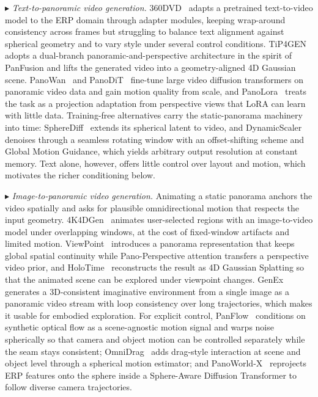 $\blacktriangleright$ \textit{Text-to-panoramic video generation.} 360DVD~\cite{wang2024360dvd} adapts a pretrained text-to-video model to the ERP domain through adapter modules, keeping wrap-around consistency across frames but struggling to balance text alignment against spherical geometry and to vary style under several control conditions.
TiP4GEN~\cite{xing2025tip4gen} adopts a dual-branch panoramic-and-perspective architecture in the spirit of PanFusion and lifts the generated video into a geometry-aligned 4D Gaussian scene.
PanoWan~\cite{xia2025panowan} and PanoDiT~\cite{zhang2025panodit} fine-tune large video diffusion transformers on panoramic video data and gain motion quality from scale, and PanoLora~\cite{dong2025panolora} treats the task as a projection adaptation from perspective views that LoRA can learn with little data.
Training-free alternatives carry the static-panorama machinery into time: SphereDiff~\cite{park2025spherediff} extends its spherical latent to video, and DynamicScaler~\cite{liu2025dynamicscaler} denoises through a seamless rotating window with an offset-shifting scheme and Global Motion Guidance, which yields arbitrary output resolution at constant memory.
Text alone, however, offers little control over layout and motion, which motivates the richer conditioning below.

$\blacktriangleright$ \textit{Image-to-panoramic video generation.} Animating a static panorama anchors the video spatially and asks for plausible omnidirectional motion that respects the input geometry.
4K4DGen~\cite{li20244k4dgen} animates user-selected regions with an image-to-video model under overlapping windows, at the cost of fixed-window artifacts and limited motion.
ViewPoint~\cite{fang2025panoramic} introduces a panorama representation that keeps global spatial continuity while Pano-Perspective attention transfers a perspective video prior, and HoloTime~\cite{zhou2025holotime} reconstructs the result as 4D Gaussian Splatting so that the animated scene can be explored under viewpoint changes.
GenEx~\cite{lu2024genex} generates a 3D-consistent imaginative environment from a single image as a panoramic video stream with loop consistency over long trajectories, which makes it usable for embodied exploration.
For explicit control, PanFlow~\cite{panflow} conditions on synthetic optical flow as a scene-agnostic motion signal and warps noise spherically so that camera and object motion can be controlled separately while the seam stays consistent; OmniDrag~\cite{li2026omnidrag} adds drag-style interaction at scene and object level through a spherical motion estimator; and PanoWorld-X~\cite{yin2025panoworld} reprojects ERP features onto the sphere inside a Sphere-Aware Diffusion Transformer to follow diverse camera trajectories.


